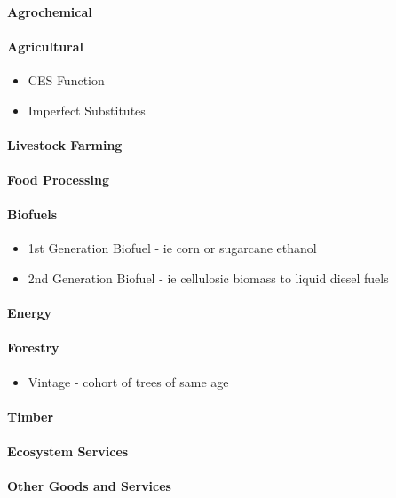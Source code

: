 \documentclass[10pt]{article}
\begin{document}
\paragraph{Agrochemical}
\paragraph{Agricultural}
\begin{itemize}
\item CES Function
\item Imperfect Substitutes
\end{itemize}
\paragraph{Livestock Farming}
\paragraph{Food Processing}
\paragraph{Biofuels}
\begin{itemize}
\item 1st Generation Biofuel - ie corn or sugarcane ethanol
\item 2nd Generation Biofuel - ie cellulosic biomass to liquid diesel fuels
\end{itemize}
\paragraph{Energy}
\paragraph{Forestry}
\begin{itemize}
\item Vintage - cohort of trees of same age
\end{itemize}
\paragraph{Timber}
\paragraph{Ecosystem Services}
\paragraph{Other Goods and Services}
\end{document}
